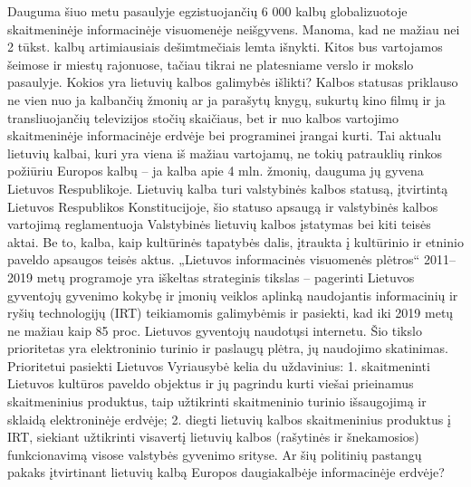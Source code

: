 \begin{multicols}{2}
Dauguma šiuo metu pasaulyje egzistuojančių 6 000 kalbų globalizuotoje skaitmeninėje informacinėje visuomenėje neišgyvens. Manoma, kad ne mažiau nei 2 tūkst. kalbų artimiausiais dešimtmečiais lemta išnykti. Kitos bus vartojamos šeimose ir miestų rajonuose, tačiau tikrai ne platesniame verslo ir mokslo pasaulyje. Kokios yra lietuvių kalbos galimybės išlikti? Kalbos statusas priklauso ne vien nuo ja kalbančių žmonių ar ja parašytų knygų, sukurtų kino filmų ir ja transliuojančių televizijos stočių skaičiaus, bet ir nuo kalbos vartojimo skaitmeninėje informacinėje erdvėje bei programinei įrangai kurti. Tai aktualu lietuvių kalbai, kuri yra viena iš mažiau vartojamų, ne tokių patrauklių rinkos požiūriu Europos kalbų – ja kalba apie 4 mln. žmonių, dauguma jų gyvena Lietuvos Respublikoje. Lietuvių kalba turi valstybinės kalbos statusą, įtvirtintą Lietuvos Respublikos Konstitucijoje, šio statuso apsaugą ir valstybinės kalbos vartojimą reglamentuoja Valstybinės lietuvių kalbos įstatymas bei kiti teisės aktai. Be to, kalba, kaip kultūrinės tapatybės dalis, įtraukta į kultūrinio ir etninio paveldo apsaugos teisės aktus. „Lietuvos informacinės visuomenės plėtros“ 2011–2019 metų programoje yra iškeltas strateginis tikslas – pagerinti Lietuvos gyventojų gyvenimo kokybę ir įmonių veiklos aplinką naudojantis informacinių ir ryšių technologijų (IRT) teikiamomis galimybėmis ir pasiekti, kad iki 2019 metų ne mažiau kaip 85 proc. Lietuvos gyventojų naudotųsi internetu. Šio tikslo prioritetas yra elektroninio turinio ir paslaugų plėtra, jų naudojimo skatinimas. Prioritetui pasiekti Lietuvos Vyriausybė kelia du uždavinius: 1. skaitmeninti Lietuvos kultūros paveldo objektus ir jų pagrindu kurti viešai prieinamus skaitmeninius produktus, taip užtikrinti skaitmeninio turinio išsaugojimą ir sklaidą elektroninėje erdvėje; 2. diegti lietuvių kalbos skaitmeninius produktus į IRT, siekiant užtikrinti visavertį lietuvių kalbos (rašytinės ir šnekamosios) funkcionavimą visose valstybės gyvenimo srityse. Ar šių politinių pastangų pakaks įtvirtinant lietuvių kalbą Europos daugiakalbėje informacinėje erdvėje? 


\end{multicols}
